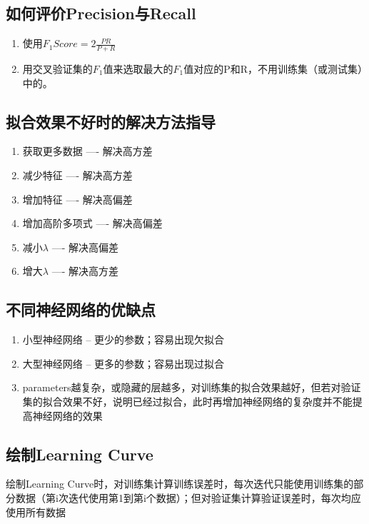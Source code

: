 \subsection{如何评价Precision与Recall}
\begin{enumerate}
	\item 使用$F_1Score = 2\frac{PR}{P+R}$
	\item 用交叉验证集的$F_1$值来选取最大的$F_1$值对应的P和R，不用训练集（或测试集）中的。
\end{enumerate}



\subsection{拟合效果不好时的解决方法指导}
\begin{enumerate}
	\item 获取更多数据 ---- 解决高方差
	\item 减少特征 ---- 解决高方差
	\item 增加特征 ---- 解决高偏差
	\item 增加高阶多项式 ---- 解决高偏差
	\item 减小$\lambda$ ---- 解决高偏差
	\item 增大$\lambda$ ---- 解决高方差
\end{enumerate}

\subsection{不同神经网络的优缺点}
\begin{enumerate}
	\item 小型神经网络 -- 更少的参数；容易出现欠拟合
	\item 大型神经网络 -- 更多的参数；容易出现过拟合
	\item parameters越复杂，或隐藏的层越多，对训练集的拟合效果越好，但若对验证集的拟合效果不好，说明已经过拟合，此时再增加神经网络的复杂度并不能提高神经网络的效果
\end{enumerate}

\subsection{绘制Learning Curve}
绘制Learning Curve时，对训练集计算训练误差时，每次迭代只能使用训练集的部分数据（第i次迭代使用第1到第i个数据）；但对验证集计算验证误差时，每次均应使用所有数据








